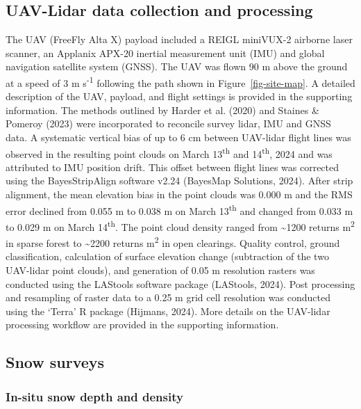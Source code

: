 \documentclass[
  letterpaper,
  DIV=11,
  numbers=noendperiod]{scrartcl}
\begin{document}
\subsection{UAV-Lidar data collection and
processing}\label{uav-lidar-data-collection-and-processing}

The UAV (FreeFly Alta X) payload included a REIGL miniVUX-2 airborne
laser scanner, an Applanix APX-20 inertial measurement unit (IMU) and
global navigation satellite system (GNSS). The UAV was flown 90 m above
the ground at a speed of 3 m s\textsuperscript{-1} following the path
shown in Figure~\ref{fig-site-map}. A detailed description of the UAV,
payload, and flight settings is provided in the supporting information.
The methods outlined by Harder et al. (2020) and Staines \& Pomeroy
(2023) were incorporated to reconcile survey lidar, IMU and GNSS data. A
systematic vertical bias of up to 6 cm between UAV-lidar flight lines
was observed in the resulting point clouds on March
13\textsuperscript{th} and 14\textsuperscript{th}, 2024 and was
attributed to IMU position drift. This offset between flight lines was
corrected using the BayesStripAlign software v2.24 (BayesMap Solutions,
2024). After strip alignment, the mean elevation bias in the point
clouds was 0.000 m and the RMS error declined from 0.055 m to 0.038 m on
March 13\textsuperscript{th} and changed from 0.033 m to 0.029 m on
March 14\textsuperscript{th}. The point cloud density ranged from
\textasciitilde1200 returns m\textsuperscript{2} in sparse forest to
\textasciitilde2200 returns m\textsuperscript{2} in open clearings.
Quality control, ground classification, calculation of surface elevation
change (subtraction of the two UAV-lidar point clouds), and generation
of 0.05 m resolution rasters was conducted using the LAStools software
package (LAStools, 2024). Post processing and resampling of raster data
to a 0.25 m grid cell resolution was conducted using the `Terra' R
package (Hijmans, 2024). More details on the UAV-lidar processing
workflow are provided in the supporting information.

\subsection{Snow surveys}\label{snow-surveys}

\subsubsection{In-situ snow depth and
density}\label{in-situ-snow-depth-and-density}
\end{document}
